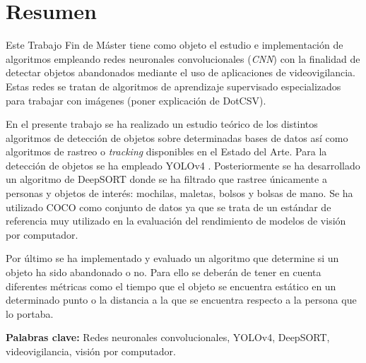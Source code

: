 
\chapter*{Resumen}
\label{cha:resumen}


Este Trabajo Fin de Máster tiene como objeto el estudio e implementación de algoritmos empleando redes neuronales convolucionales (\textit{CNN}) con la finalidad de detectar objetos abandonados mediante el uso de aplicaciones de videovigilancia. Estas redes se tratan de algoritmos de aprendizaje supervisado especializados para trabajar con imágenes (poner explicación de DotCSV).

En el presente trabajo se ha realizado un estudio teórico de los distintos algoritmos de detección de objetos sobre determinadas bases de datos así como algoritmos de rastreo o \textit{tracking} disponibles en el Estado del Arte. Para la detección de objetos se ha empleado YOLOv4 \cite{bochkovskiy2020yolov4}. Posteriormente se ha desarrollado un algoritmo de DeepSORT \cite{Wojke2017simple} donde se ha filtrado que rastree únicamente a personas y objetos de interés: mochilas, maletas, bolsos y bolsas de mano. Se ha utilizado COCO \cite{lin2015microsoft} como conjunto de datos ya que se trata de un estándar de referencia muy utilizado en la evaluación del rendimiento de modelos de visión por computador.

Por último se ha implementado y evaluado un algoritmo que determine si un objeto ha sido abandonado o no. Para ello se deberán de tener en cuenta diferentes métricas como el tiempo que el objeto se encuentra estático en un determinado punto o la distancia a la que se encuentra respecto a la persona que lo portaba.

\textbf{Palabras clave:} Redes neuronales convolucionales, YOLOv4, DeepSORT, videovigilancia, visión por computador.